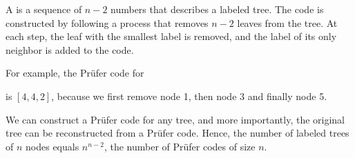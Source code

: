 
A  is a sequence of
$n-2$ numbers that describes a labeled tree.
The code is constructed by following a process
that removes $n-2$ leaves from the tree.
At each step, the leaf with the smallest label is removed,
and the label of its only neighbor is added to the code.

For example, the Prüfer code for
\begin{center}
\end{center}
is $[4,4,2]$, because we first remove
node 1, then node 3 and finally node 5.

We can construct a Prüfer code for any tree,
and more importantly,
the original tree can be reconstructed
from a Prüfer code.
Hence, the number of labeled trees
of $n$ nodes equals
$n^{n-2}$, the number of Prüfer codes
of size $n$.
